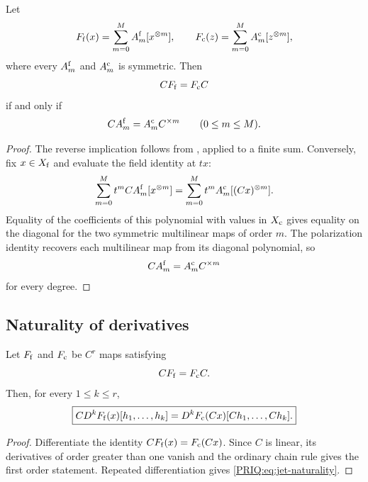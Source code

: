 \begin{PRIQtheorem}\label{PRIQ:thm:polynomial-coefficientwise}
Let
\[
  F_{\mathrm f}(x)=\sum_{m=0}^{M}A_m^{\mathrm f}[x^{\otimes m}],
  \qquad
  F_{\mathrm c}(z)=\sum_{m=0}^{M}A_m^{\mathrm c}[z^{\otimes m}],
\]
where every $A_m^{\mathrm f}$ and $A_m^{\mathrm c}$ is symmetric.  Then
\[
  CF_{\mathrm f}=F_{\mathrm c}C
\]
if and only if
\[
  CA_m^{\mathrm f}=A_m^{\mathrm c}C^{\times m}
  \qquad(0\leq m\leq M).
\]
\end{PRIQtheorem}

\begin{proof}
The reverse implication follows from , applied to a finite sum.  Conversely, fix $x\in X_{\mathrm f}$ and evaluate the field identity at $tx$:
\[
  \sum_{m=0}^{M}t^mCA_m^{\mathrm f}[x^{\otimes m}]
  =
  \sum_{m=0}^{M}t^mA_m^{\mathrm c}[(Cx)^{\otimes m}].
\]
Equality of the coefficients of this polynomial with values in $X_{\mathrm c}$ gives equality on the diagonal for the two symmetric multilinear maps of order $m$.  The polarization identity recovers each multilinear map from its diagonal polynomial, so
\[
  CA_m^{\mathrm f}=A_m^{\mathrm c}C^{\times m}
\]
for every degree.
\end{proof}

\subsection{Naturality of derivatives}

\begin{PRIQproposition}\label{PRIQ:prop:jet-naturality}
Let $F_{\mathrm f}$ and $F_{\mathrm c}$ be $C^r$ maps satisfying
\[
  CF_{\mathrm f}=F_{\mathrm c}C.
\]
Then, for every $1\leq k\leq r$,
\begin{equation}\label{PRIQ:eq:jet-naturality}
  \boxed{
  C D^kF_{\mathrm f}(x)[h_1,\ldots,h_k]
  =
  D^kF_{\mathrm c}(Cx)[Ch_1,\ldots,Ch_k].}
\end{equation}
\end{PRIQproposition}

\begin{proof}
Differentiate the identity $CF_{\mathrm f}(x)=F_{\mathrm c}(Cx)$.  Since $C$ is linear, its derivatives of order greater than one vanish and the ordinary chain rule gives the first order statement.  Repeated differentiation gives \eqref{PRIQ:eq:jet-naturality}.
\end{proof}

